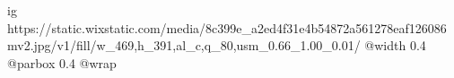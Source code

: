  
 
 
 
 

\ifcmt
  ig https://static.wixstatic.com/media/8c399e_a2ed4f31e4b54872a561278eaf126086~mv2.jpg/v1/fill/w_469,h_391,al_c,q_80,usm_0.66_1.00_0.01/%
  @width 0.4
  @parbox 0.4
  @wrap \parpic[r]
\fi

